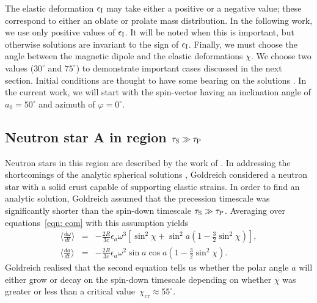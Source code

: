 \documentclass[../full_thesis/full_thesis.tex]{subfiles}
\begin{document}
The elastic deformation $\epsilon_{\mathrm{I}}$ may take either a positive or a negative
value; these correspond to either an oblate or prolate mass distribution.  In
the following work, we use only positive values of $\epsilon_{\mathrm{I}}$. It will be noted
when this is important, but otherwise solutions are invariant to the sign of
$\epsilon_{\mathrm{I}}$. Finally, we must choose the angle between the magnetic dipole and the
elastic deformations $\chi$. We choose two values ($30^\circ$ and $75^\circ$)
to demonstrate important cases discussed in the next section. Initial
conditions are thought to have some bearing on the solutions
\citep[see][]{Melatos2000}. In the current work, we will start with the
spin-vector having an inclination angle of $a_0=50^{\circ}$ and azimuth of
$\varphi=0^{\circ}$.


\subsection{Neutron star A in region \texorpdfstring{$\tau_{\mathrm{S}}\gg \tau_{\mathrm{P}}$}{}}
\label{sec: A_NA}
Neutron stars in this region are described by the work of \citet{Goldreich1970}. In
addressing the shortcomings of the analytic spherical solutions
\citep{Davis1970, Michel1970}, Goldreich considered a neutron star with a solid
crust capable of supporting elastic strains. In order to find an analytic
solution, Goldreich assumed that the precession timescale was significantly
shorter than the spin-down timescale $\tau_{\mathrm{S}} \gg \tau_{\mathrm{P}}$. Averaging
over equations~\eqref{eqn: eom} with this assumption yields
\begin{eqnarray}
\Big\langle \frac{d \omega}{dt}\Big\rangle & = & -\frac{2R}{3c}\epsilon_{a}\omega^{3}\left[ \sin^{2} \chi +\sin^{2}a \left(1-\frac{3}{2}\sin^{2}\chi\right)\right], \\
\Big\langle \frac{d a}{dt}\Big\rangle & = & -\frac{2R}{3c}\epsilon_{a}\omega^{2}\sin a \cos a \left(1-\frac{3}{2}\sin^{2}\chi\right).
\label{eqn: goldreich_averaged_eqns}
\end{eqnarray}
Goldreich realised that the second equation tells us whether the polar angle $a$ will
either grow or decay on the spin-down timescale depending on whether $\chi$ was
greater or less than a critical value~$\chi_{\textrm{cr}} \approx 55^{\circ}$.
\end{document}
